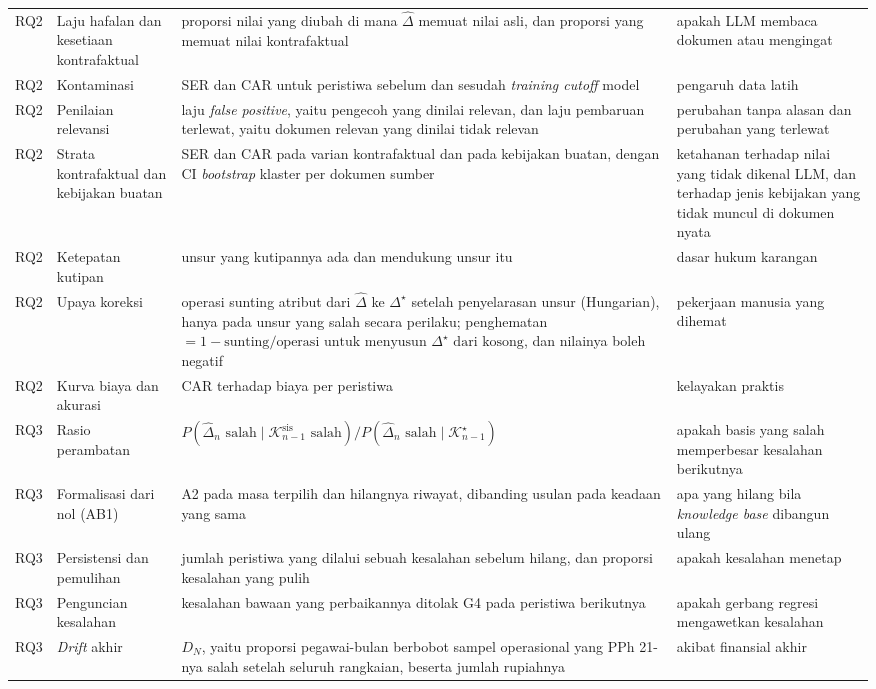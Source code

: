 \documentclass[journal,a4paper]{IEEEtran}
\newcommand{\en}[1]{\textit{#1}}
\newcommand{\K}{\mathcal{K}}
\newcommand{\emas}{\star}
\begin{document}
\begin{table}[t]
\begin{tabularx}{\textwidth}{@{}P{1.2cm} P{3.4cm} L P{3.4cm}@{}}
RQ2 & Laju hafalan dan kesetiaan kontrafaktual & proporsi nilai yang diubah di mana $\hat{\Delta}$ memuat nilai asli, dan proporsi yang memuat nilai kontrafaktual & apakah LLM membaca dokumen atau mengingat \\
RQ2 & Kontaminasi & SER dan CAR untuk peristiwa sebelum dan sesudah \en{training cutoff} model & pengaruh data latih \\
RQ2 & Penilaian relevansi & laju \en{false positive}, yaitu pengecoh yang dinilai relevan, dan laju pembaruan terlewat, yaitu dokumen relevan yang dinilai tidak relevan & perubahan tanpa alasan dan perubahan yang terlewat \\
RQ2 & Strata kontrafaktual dan kebijakan buatan & SER dan CAR pada varian kontrafaktual dan pada kebijakan buatan, dengan CI \en{bootstrap} klaster per dokumen sumber & ketahanan terhadap nilai yang tidak dikenal LLM, dan terhadap jenis kebijakan yang tidak muncul di dokumen nyata \\
RQ2 & Ketepatan kutipan & unsur yang kutipannya ada dan mendukung unsur itu & dasar hukum karangan \\
RQ2 & Upaya koreksi & operasi sunting atribut dari $\hat{\Delta}$ ke $\Delta^{\emas}$ setelah penyelarasan unsur (Hungarian), hanya pada unsur yang salah secara perilaku; penghematan $= 1 - \text{sunting}/\text{operasi untuk menyusun } \Delta^{\emas} \text{ dari kosong}$, dan nilainya boleh negatif & pekerjaan manusia yang dihemat \\
RQ2 & Kurva biaya dan akurasi & CAR terhadap biaya per peristiwa & kelayakan praktis \\
\midrule
RQ3 & Rasio perambatan & $P(\hat{\Delta}_n \text{ salah} \mid \K^{\mathrm{sis}}_{n-1} \text{ salah}) / P(\hat{\Delta}_n \text{ salah} \mid \K^{\emas}_{n-1})$ & apakah basis yang salah memperbesar kesalahan berikutnya \\
RQ3 & Formalisasi dari nol (AB1) & A2 pada masa terpilih dan hilangnya riwayat, dibanding usulan pada keadaan yang sama & apa yang hilang bila \en{knowledge base} dibangun ulang \\
RQ3 & Persistensi dan pemulihan & jumlah peristiwa yang dilalui sebuah kesalahan sebelum hilang, dan proporsi kesalahan yang pulih & apakah kesalahan menetap \\
RQ3 & Penguncian kesalahan & kesalahan bawaan yang perbaikannya ditolak G4 pada peristiwa berikutnya & apakah gerbang regresi mengawetkan kesalahan \\
RQ3 & \en{Drift} akhir & $D_N$, yaitu proporsi pegawai-bulan berbobot sampel operasional yang PPh 21-nya salah setelah seluruh rangkaian, beserta jumlah rupiahnya & akibat finansial akhir \\

\end{tabularx}
\end{table}
\end{document}

